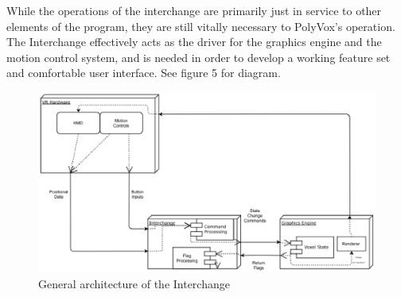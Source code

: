 \documentclass[onecolumn, draftclsnofoot,10pt, compsoc]{IEEEtran}
\begin{document}
While the operations of the interchange are primarily just in service to other elements of the program, they are still vitally necessary to PolyVox’s operation. The Interchange effectively acts as the driver for the graphics engine and the motion control system, and is needed in order to develop a working feature set and comfortable user interface. See figure 5 for diagram.

\begin{figure}[H]
\begin{center}
\includegraphics[width=\textwidth]{images/Interchange.eps}
\caption{General architecture of the Interchange}
\end{center}
\end{figure}
\end{document}
